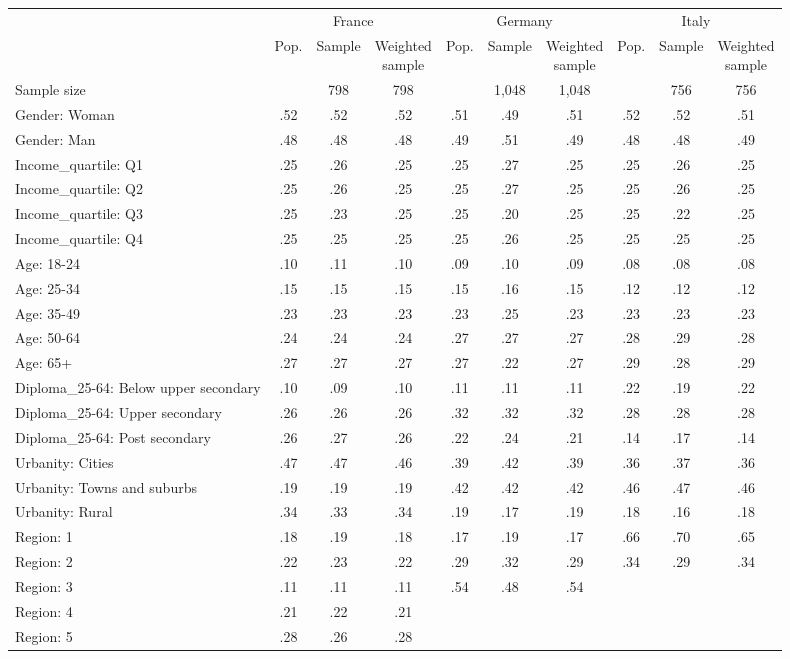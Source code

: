 
\begin{tabular}[t]{lccccccccc}
\toprule
\multicolumn{1}{c}{} & \multicolumn{3}{c}{France} & \multicolumn{3}{c}{Germany} & \multicolumn{3}{c}{Italy} \\
\cmidrule(l{3pt}r{3pt}){2-4} \cmidrule(l{3pt}r{3pt}){5-7} \cmidrule(l{3pt}r{3pt}){8-10}
  & Pop. & Sample & \makecell{Weighted\\sample} & Pop. & Sample & \makecell{Weighted\\sample} & Pop. & Sample & \makecell{Weighted\\sample}\\
\midrule
Sample size &  & 798 & 798 &  & 1,048 & 1,048 &  & 756 & 756\\
\addlinespace
Gender: Woman & .52 & .52 & .52 & .51 & .49 & .51 & .52 & .52 & .51\\
Gender: Man & .48 & .48 & .48 & .49 & .51 & .49 & .48 & .48 & .49\\
\addlinespace
Income\_quartile: Q1 & .25 & .26 & .25 & .25 & .27 & .25 & .25 & .26 & .25\\
Income\_quartile: Q2 & .25 & .26 & .25 & .25 & .27 & .25 & .25 & .26 & .25\\
Income\_quartile: Q3 & .25 & .23 & .25 & .25 & .20 & .25 & .25 & .22 & .25\\
Income\_quartile: Q4 & .25 & .25 & .25 & .25 & .26 & .25 & .25 & .25 & .25\\
\addlinespace
Age: 18-24 & .10 & .11 & .10 & .09 & .10 & .09 & .08 & .08 & .08\\
Age: 25-34 & .15 & .15 & .15 & .15 & .16 & .15 & .12 & .12 & .12\\
Age: 35-49 & .23 & .23 & .23 & .23 & .25 & .23 & .23 & .23 & .23\\
Age: 50-64 & .24 & .24 & .24 & .27 & .27 & .27 & .28 & .29 & .28\\
Age: 65+ & .27 & .27 & .27 & .27 & .22 & .27 & .29 & .28 & .29\\
\addlinespace
Diploma\_25-64: Below upper secondary & .10 & .09 & .10 & .11 & .11 & .11 & .22 & .19 & .22\\
Diploma\_25-64: Upper secondary & .26 & .26 & .26 & .32 & .32 & .32 & .28 & .28 & .28\\
Diploma\_25-64: Post secondary & .26 & .27 & .26 & .22 & .24 & .21 & .14 & .17 & .14\\
\addlinespace
Urbanity: Cities & .47 & .47 & .46 & .39 & .42 & .39 & .36 & .37 & .36\\
Urbanity: Towns and suburbs & .19 & .19 & .19 & .42 & .42 & .42 & .46 & .47 & .46\\
Urbanity: Rural & .34 & .33 & .34 & .19 & .17 & .19 & .18 & .16 & .18\\
\addlinespace
Region: 1 & .18 & .19 & .18 & .17 & .19 & .17 & .66 & .70 & .65\\
Region: 2 & .22 & .23 & .22 & .29 & .32 & .29 & .34 & .29 & .34\\
Region: 3 & .11 & .11 & .11 & .54 & .48 & .54 &  &  & \\
Region: 4 & .21 & .22 & .21 &  &  &  &  &  & \\
Region: 5 & .28 & .26 & .28 &  &  &  &  &  & \\
\bottomrule
\end{tabular}